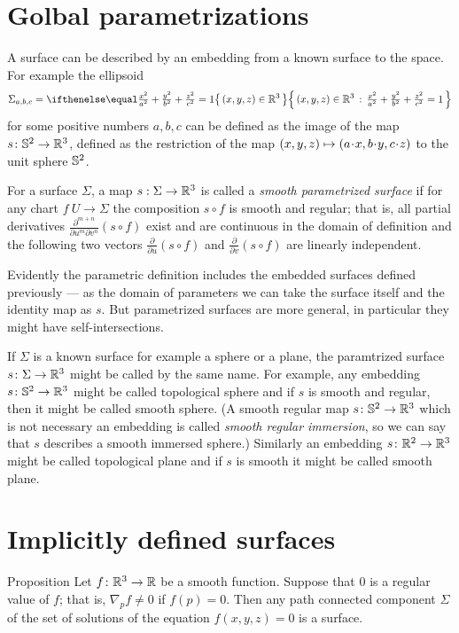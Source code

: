 \section*{Golbal parametrizations} 
A surface can be described by an embedding from a known surface to the space.
For example the ellipsoid
\[\Sigma_{a,b,c}=\set{(x,y,z)\in\RR^3}{\tfrac{x^2}{a^2}+\tfrac{y^2}{b^2}+\tfrac{z^2}{c^2}=1}\]
for some positive numbers $a,b,c$ can be defined as the image of the map $s\colon\mathbb{S}^2\to\mathbb{R}^3$, defined as the restriction of the map $(x,y,z)\z\mapsto (a\cdot x, b\cdot y,c\cdot z)$ to the unit sphere $\mathbb{S}^2$.

For a surface $\Sigma$, a map $s: \Sigma \to \mathbb{R} ^3$ is called a 
\emph{smooth parametrized surface} if for any chart $f\:U\to \Sigma$ 
the composition $s\circ f$ is smooth and regular;
that is, all partial derivatives $\frac{\partial^{m+n}}{\partial u^m\partial v^n}(s\circ f)$ exist and are continuous in the domain of definition and the following two vectors 
$\frac{\partial}{\partial u}(s\circ f)$ and $\frac{\partial}{\partial v}(s\circ f)$ are linearly independent.

Evidently the parametric definition includes the embedded surfaces defined previously --- as the domain of parameters we can take the surface itself and the identity map as $s$.
But parametrized surfaces are more general, in particular they  might  have self-intersections.

If $\Sigma$ is a known surface for example a sphere or a plane, the paramtrized surface $s\colon\Sigma\to\mathbb{R}^3$ might be called by the same name.
For example, any embedding $s\colon\mathbb{S}^2\to\mathbb{R}^3$ might be called topological sphere
and if $s$ is smooth and regular, then it might be called smooth sphere.
(A smooth regular map $s\colon\mathbb{S}^2\to\mathbb{R}^3$ which is not necessary an embedding is called \emph{smooth regular immersion}, so we can say that $s$ describes a smooth immersed sphere.) 
Similarly an embedding $s\colon\mathbb{R}^2\to\mathbb{R}^3$ might be called topological plane
and if $s$ is smooth it might be called smooth plane.

\section*{Implicitly defined surfaces}

\begin{thm}{Proposition}
Let $f\colon\mathbb{R}^3\to \mathbb{R}$ be a smooth function.
Suppose that $0$ is a regular value of $f$;
that is, $\nabla_p f\ne 0$ if $f(p)=0$.
Then any path connected component $\Sigma$ of the set of solutions of the equation $f(x,y,z)=0$ is a surface.
\end{thm}

